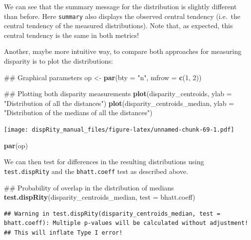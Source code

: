 \documentclass[]{book}
\newenvironment{Shaded}{\begin{snugshade}}{\end{snugshade}}
\newcommand{\KeywordTok}[1]{\textcolor[rgb]{0.13,0.29,0.53}{\textbf{#1}}}
\newcommand{\DataTypeTok}[1]{\textcolor[rgb]{0.13,0.29,0.53}{#1}}
\newcommand{\DecValTok}[1]{\textcolor[rgb]{0.00,0.00,0.81}{#1}}
\newcommand{\StringTok}[1]{\textcolor[rgb]{0.31,0.60,0.02}{#1}}
\newcommand{\NormalTok}[1]{#1}
\theoremstyle{definition}
\theoremstyle{definition}
\theoremstyle{remark}
\begin{document}
We can see that the summary message for the distribution is slightly
different than before. Here \texttt{summary} also displays the observed
central tendency (i.e.~the central tendency of the measured
distributions). Note that, as expected, this central tendency is the
same in both metrics!

Another, maybe more intuitive way, to compare both approaches for
measuring disparity is to plot the distributions:

\begin{Shaded}
\begin{Highlighting}[]
\NormalTok{## Graphical parameters}
\NormalTok{op <-}\StringTok{ }\KeywordTok{par}\NormalTok{(}\DataTypeTok{bty =} \StringTok{"n"}\NormalTok{, }\DataTypeTok{mfrow =} \KeywordTok{c}\NormalTok{(}\DecValTok{1}\NormalTok{, }\DecValTok{2}\NormalTok{))}

\NormalTok{## Plotting both disparity measurements}
\KeywordTok{plot}\NormalTok{(disparity_centroids, }\DataTypeTok{ylab =} \StringTok{"Distribution of all the distances"}\NormalTok{)}
\KeywordTok{plot}\NormalTok{(disparity_centroids_median,}
     \DataTypeTok{ylab =} \StringTok{"Distribution of the medians of all the distances"}\NormalTok{)}
\end{Highlighting}
\end{Shaded}

\texttt{[image: dispRity\_manual\_files/figure-latex/unnamed-chunk-69-1.pdf]}

\begin{Shaded}
\begin{Highlighting}[]
\KeywordTok{par}\NormalTok{(op)}
\end{Highlighting}
\end{Shaded}

We can then test for differences in the resulting distributions using
\texttt{test.dispRity} and the \texttt{bhatt.coeff} test as described
above.

\begin{Shaded}
\begin{Highlighting}[]
\NormalTok{## Probability of overlap in the distribution of medians}
\KeywordTok{test.dispRity}\NormalTok{(disparity_centroids_median, }\DataTypeTok{test =}\NormalTok{ bhatt.coeff)}
\end{Highlighting}
\end{Shaded}

\begin{verbatim}
## Warning in test.dispRity(disparity_centroids_median, test = bhatt.coeff): Multiple p-values will be calculated without adjustment!
## This will inflate Type I error!
\end{verbatim}
\end{document}
